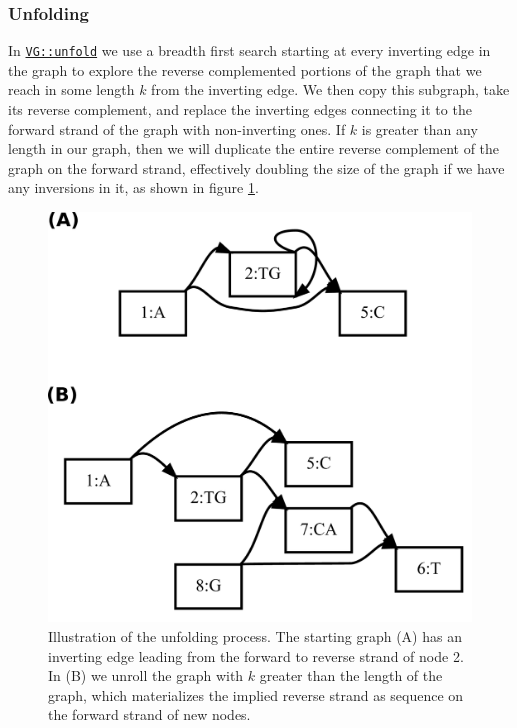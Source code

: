 \documentclass[12pt]{article}
\begin{document}
\subsubsection{Unfolding}

In \href{https://github.com/vgteam/vg/blob/fbcb6e62/src/vg.cpp#L8289-L8400}{{\tt VG::unfold}} we use a breadth first search starting at every inverting edge in the graph to explore the reverse complemented portions of the graph that we reach in some length $k$ from the inverting edge.
We then copy this subgraph, take its reverse complement, and replace the inverting edges connecting it to the forward strand of the graph with non-inverting ones.
If $k$ is greater than any length in our graph, then we will duplicate the entire reverse complement of the graph on the forward strand, effectively doubling the size of the graph if we have any inversions in it, as shown in figure \ref{fig:unfold}.

\begin{figure}[t]
\centering
\includegraphics[width=1.0\textwidth]{figures/unfold}
\caption{\label{fig:unfold}
  Illustration of the unfolding process. The starting graph (A) has an inverting edge leading from the forward to reverse strand of node 2.
  In (B) we unroll the graph with $k$ greater than the length of the graph, which materializes the implied reverse strand as sequence on the forward strand of new nodes.
}
\end{figure}
\end{document}
